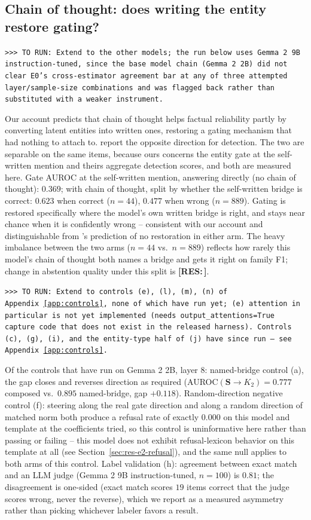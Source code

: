 \documentclass{article}
\newcommand{\RES}[1]{{\color{red}\textbf{[RES:\,#1]}}}
\newcommand{\TORUN}[1]{{\color{blue}\texttt{>{}>{}> TO RUN: #1}}}
\newcommand{\gate}{\mathbf{S}}
\begin{document}
\subsection{Chain of thought: does writing the entity restore gating?}
\label{sec:res-cot}



\TORUN{Extend to the other models; the run below uses Gemma 2 9B instruction-tuned, since the base
model chain (Gemma 2 2B) did not clear E0's cross-estimator agreement bar at any of three attempted
layer/sample-size combinations and was flagged back rather than substituted with a weaker instrument.}

Our account predicts that chain of thought helps factual reliability partly by converting latent
entities into written ones, restoring a gating mechanism that had nothing to attach to.
\citet{cheng2025cotobscures} report the opposite direction for detection. The two are separable on
the same items, because ours concerns the entity gate at the self-written mention and theirs
aggregate detection scores, and both are measured here. Gate AUROC at the self-written mention,
answering directly (no chain of thought): $0.369$; with chain of thought, split by whether the
self-written bridge is correct: $0.623$ when correct ($n=44$), $0.477$ when wrong ($n=889$). Gating is
restored specifically where the model's own written bridge is right, and stays near chance when it is
confidently wrong -- consistent with our account and distinguishable from
\citet{cheng2025cotobscures}'s prediction of no restoration in either arm. The heavy imbalance between
the two arms ($n=44$ vs.\ $n=889$) reflects how rarely this model's chain of thought both names a
bridge and gets it right on family F1; change in abstention quality under this split is \RES{}.



\TORUN{Extend to controls (e), (l), (m), (n) of Appendix~\ref{app:controls}, none of which have run
yet; (e) attention in particular is not yet implemented (needs
\texttt{output\_attentions=True} capture code that does not exist in the released harness). Controls
(c), (g), (i), and the entity-type half of (j) have since run -- see Appendix~\ref{app:controls}.}

Of the controls that have run on Gemma 2 2B, layer 8: named-bridge control (a), the gap closes and
reverses direction as required (AUROC$(\gate\!\to\!K_2)=0.777$ composed vs.\ $0.895$ named-bridge, gap
$+0.118$). Random-direction negative control (f): steering along the real gate direction and along a
random direction of matched norm both produce a refusal rate of exactly $0.000$ on this model and
template at the coefficients tried, so this control is uninformative here rather than passing or
failing -- this model does not exhibit refusal-lexicon behavior on this template at all (see
Section~\ref{sec:res-e2-refusal}), and the same null applies to both arms of this control. Label
validation (h): agreement between exact match and an LLM judge (Gemma 2 9B instruction-tuned,
$n=100$) is $0.81$; the disagreement is one-sided (exact match scores $19$ items correct that the
judge scores wrong, never the reverse), which we report as a measured asymmetry rather than picking
whichever labeler favors a result.
\end{document}
